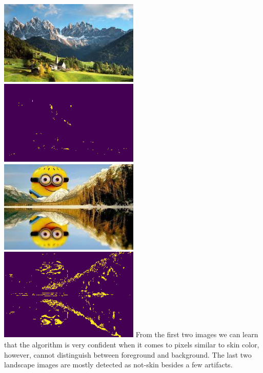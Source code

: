 \includegraphics[width=0.5\textwidth]{alps.jpg}
\includegraphics[width=0.5\textwidth]{alps_skin.png}
\includegraphics[width=0.5\textwidth]{minion_landscape.jpg}
\includegraphics[width=0.5\textwidth]{minion_landscape_skin.png}
From the first two images we can learn that the algorithm is very confident when it comes to pixels similar to skin color, however, cannot distinguish between foreground and background. The last two landscape images are mostly detected as not-skin besides a few artifacts.